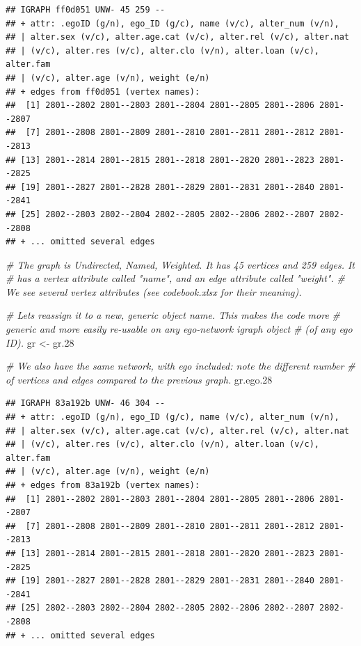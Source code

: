 \documentclass[
]{book}
\newenvironment{Shaded}{\begin{snugshade}}{\end{snugshade}}
\newcommand{\CommentTok}[1]{\textcolor[rgb]{0.56,0.35,0.01}{\textit{#1}}}
\newcommand{\FloatTok}[1]{\textcolor[rgb]{0.00,0.00,0.81}{#1}}
\newcommand{\NormalTok}[1]{#1}
\newcommand{\OtherTok}[1]{\textcolor[rgb]{0.56,0.35,0.01}{#1}}
\begin{document}
\begin{verbatim}
## IGRAPH ff0d051 UNW- 45 259 -- 
## + attr: .egoID (g/n), ego_ID (g/c), name (v/c), alter_num (v/n),
## | alter.sex (v/c), alter.age.cat (v/c), alter.rel (v/c), alter.nat
## | (v/c), alter.res (v/c), alter.clo (v/n), alter.loan (v/c), alter.fam
## | (v/c), alter.age (v/n), weight (e/n)
## + edges from ff0d051 (vertex names):
##  [1] 2801--2802 2801--2803 2801--2804 2801--2805 2801--2806 2801--2807
##  [7] 2801--2808 2801--2809 2801--2810 2801--2811 2801--2812 2801--2813
## [13] 2801--2814 2801--2815 2801--2818 2801--2820 2801--2823 2801--2825
## [19] 2801--2827 2801--2828 2801--2829 2801--2831 2801--2840 2801--2841
## [25] 2802--2803 2802--2804 2802--2805 2802--2806 2802--2807 2802--2808
## + ... omitted several edges
\end{verbatim}

\begin{Shaded}
\begin{Highlighting}[]
\CommentTok{\# The graph is Undirected, Named, Weighted. It has 45 vertices and 259 edges. It}
\CommentTok{\# has a vertex attribute called "name", and an edge attribute called "weight". }
\CommentTok{\# We see several vertex attributes (see codebook.xlsx for their meaning).}

\CommentTok{\# Let\textquotesingle{}s reassign it to a new, generic object name. This makes the code more }
\CommentTok{\# generic and more easily re{-}usable on any ego{-}network igraph object }
\CommentTok{\# (of any ego ID).}
\NormalTok{gr }\OtherTok{\textless{}{-}}\NormalTok{ gr}\FloatTok{.28}

\CommentTok{\# We also have the same network, with ego included: note the different number}
\CommentTok{\# of vertices and edges compared to the previous graph.}
\NormalTok{gr.ego}\FloatTok{.28}
\end{Highlighting}
\end{Shaded}

\begin{verbatim}
## IGRAPH 83a192b UNW- 46 304 -- 
## + attr: .egoID (g/n), ego_ID (g/c), name (v/c), alter_num (v/n),
## | alter.sex (v/c), alter.age.cat (v/c), alter.rel (v/c), alter.nat
## | (v/c), alter.res (v/c), alter.clo (v/n), alter.loan (v/c), alter.fam
## | (v/c), alter.age (v/n), weight (e/n)
## + edges from 83a192b (vertex names):
##  [1] 2801--2802 2801--2803 2801--2804 2801--2805 2801--2806 2801--2807
##  [7] 2801--2808 2801--2809 2801--2810 2801--2811 2801--2812 2801--2813
## [13] 2801--2814 2801--2815 2801--2818 2801--2820 2801--2823 2801--2825
## [19] 2801--2827 2801--2828 2801--2829 2801--2831 2801--2840 2801--2841
## [25] 2802--2803 2802--2804 2802--2805 2802--2806 2802--2807 2802--2808
## + ... omitted several edges
\end{verbatim}
\end{document}
